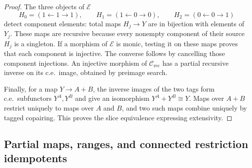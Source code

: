 \begin{proof}
The three objects of $\mathcal E$
\[
 H_0=(1\leftarrow1\to1),\qquad
 H_1=(1\leftarrow0\to0),\qquad
 H_2=(0\leftarrow0\to1)
\]
detect component elements: total maps $H_j\to Y$ are in bijection
with elements of $Y_j$. These maps are recursive because every
nonempty component of their source $H_j$ is a singleton.
If a morphism of $\mathcal E$ is monic,
testing it on these maps proves that each component is injective.
The converse follows by cancelling those component injections.
An injective morphism of $\mathcal C_{\mathrm{rec}}$ has a partial recursive inverse
on its c.e.\ image, obtained by preimage search.

Finally, for a map $Y\to A+B$, the inverse images of the two
tags form c.e.\ subfunctors $Y^A,Y^B$ and give an isomorphism
$Y^A+Y^B\cong Y$. Maps over $A+B$ restrict uniquely to maps
over $A$ and $B$, and two such maps combine uniquely by tagged
copairing. This proves the slice equivalence expressing extensivity.
\end{proof}

\subsection{Partial maps, ranges, and connected restriction idempotents}

